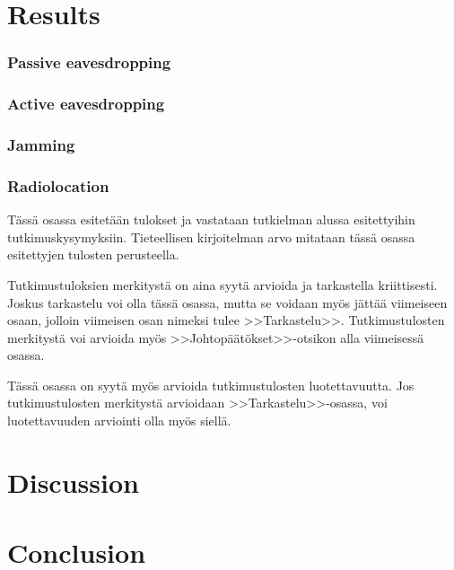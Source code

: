 \documentclass[english, 12pt, a4paper, elec, utf8, a-1b, online]{aaltothesis}
\begin{document}
\clearpage

\section{Results}
\subsubsection{Passive eavesdropping}
\subsubsection{Active eavesdropping}
\subsubsection{Jamming}
\subsubsection{Radiolocation}


T\"ass\"a osassa esitet\"a\"an tulokset ja vastataan tutkielman alussa
esitettyihin tutkimuskysymyksiin. Tieteellisen kirjoitelman
arvo mitataan t\"ass\"a osassa esitettyjen tulosten perusteella. 

Tutkimustuloksien merkityst\"a on aina syyt\"a arvioida ja tarkastella
kriittisesti.  Joskus tarkastelu voi olla t\"ass\"a osassa, mutta se
voidaan my\"os j\"att\"a\"a viimeiseen osaan, jolloin viimeisen osan nimeksi
tulee >>Tarkastelu>>. Tutkimustulosten merkityst\"a voi arvioida my\"os
>>Johtop\"a\"at\"okset>>-otsikon alla viimeisess\"a osassa. 

T\"ass\"a osassa on syyt\"a my\"os arvioida tutkimustulosten luotettavuutta.
Jos tutkimustulosten merkityst\"a arvioidaan >>Tarkastelu>>-osassa,
voi luotettavuuden arviointi olla my\"os siell\"a. 

\section{Discussion}

\clearpage

\section{Conclusion}
\end{document}
